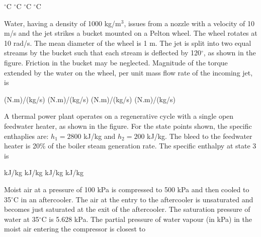 \documentclass[addpoints,11pt]{exam}
\begin{document}
\begin{questions}
        \begin{oneparchoices}
            $^\circ$C
            $^\circ$C
            $^\circ$C
            $^\circ$C
        \end{oneparchoices}

        \question Water, having a density of 1000 kg/m$^3$, issues from a nozzle with a velocity of 10 m/s and the jet strikes a bucket mounted on a Pelton wheel. The wheel rotates at 10 rad/s. The mean diameter of the wheel is 1 m. The jet is split into two equal streams by the bucket such that each stream is deflected by 120$^\circ$, as shown in the figure. Friction in the bucket may be neglected. Magnitude of the torque extended by the water on the wheel, per unit mass flow rate of the incoming jet, is%

        \begin{oneparchoices}
             (N.m)/(kg/s)
             (N.m)/(kg/s)
             (N.m)/(kg/s)
             (N.m)/(kg/s)
        \end{oneparchoices}

        \question A thermal power plant operates on a regenerative cycle with a single open feedwater heater, as shown in the figure. For the state points shown, the specific enthaplies are: $h_1 = 2800$ kJ/kg and $h_2 = 200$ kJ/kg. The bleed to the feedwater heater is 20\% of the boiler steam generation rate. The specific enthalpy at state 3 is%

        \begin{oneparchoices}
             kJ/kg
             kJ/kg
             kJ/kg
             kJ/kg
        \end{oneparchoices}

        \question Moist air at a pressure of 100 kPa is compressed to 500 kPa and then cooled to 35$^\circ$C in an aftercooler. The air at the entry to the aftercooler is unsaturated and becomes just saturated at the exit of the aftercooler. The saturation pressure of water at 35$^\circ$C is 5.628 kPa. The partial pressure of water vapour (in kPa) in the moist air entering the compressor is closest to

        \begin{oneparchoices}
        \end{oneparchoices}


\end{questions}
\end{document}
